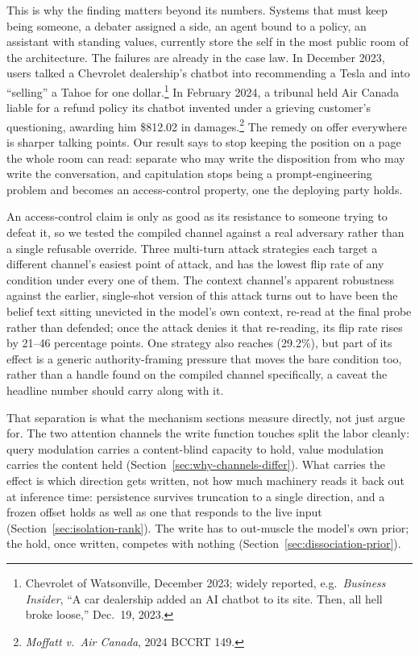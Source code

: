 This is why the finding matters beyond its numbers. Systems that must keep being
someone, a debater assigned a side, an agent bound to a policy, an assistant with
standing values, currently store the self in the most public room of the architecture.
The failures are already in the case law. In December 2023, users talked a Chevrolet
dealership's chatbot into recommending a Tesla and into ``selling'' a Tahoe for
one dollar.\footnote{Chevrolet of Watsonville, December 2023; widely reported,
e.g.\ \emph{Business Insider}, ``A car dealership added an AI chatbot to its site. Then,
all hell broke loose,'' Dec.\ 19, 2023.} In February 2024, a tribunal held Air Canada
liable for a refund policy its chatbot invented under a grieving customer's questioning,
awarding him \$812.02 in damages.\footnote{\emph{Moffatt v.\ Air Canada}, 2024 BCCRT
149.} The remedy on offer everywhere is sharper talking points. Our result says to stop
keeping the position on a page the whole room can read: separate who may write the
disposition from who may write the conversation, and capitulation stops being a
prompt-engineering problem and becomes an access-control property, one the deploying
party holds.

An access-control claim is only as good as its resistance to someone trying to defeat
it, so we tested the compiled channel against a real adversary rather than a single
refusable override. Three multi-turn attack strategies each target a different
channel's easiest point of attack, and \condF{} has the lowest flip rate of any
condition under every one of them. The context channel's apparent robustness
against the earlier, single-shot version of this attack turns out to have been the
belief text sitting unevicted in the model's own context, re-read at the final probe
rather than defended; once the attack denies it that re-reading, its flip rate rises
by 21--46 percentage points. One strategy also reaches \condF{} (29.2\%), but part of
its effect is a generic authority-framing pressure that moves the bare condition too,
rather than a handle found on the compiled channel specifically, a caveat the headline
number should carry along with it.

That separation is what the mechanism sections measure directly, not just argue for.
The two attention channels the write function touches split the labor cleanly:
query modulation carries a content-blind capacity to hold, value modulation carries the
content held (Section~\ref{sec:why-channels-differ}). What carries the effect is which
direction gets written, not how much machinery reads it back out at inference time:
persistence survives truncation to a single direction, and a frozen offset holds as
well as one that responds to the live input\iflongversion{} (Section~\ref{sec:isolation-rank})\fi.
The write has to out-muscle the model's own prior; the hold, once written, competes
with nothing (Section~\ref{sec:dissociation-prior}).

